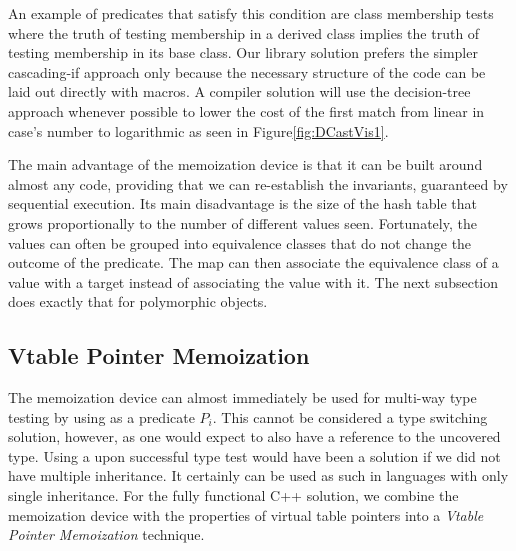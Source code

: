 \noindent
An example of predicates that satisfy this condition are class membership tests
where the truth of testing membership in a derived class implies 
the truth of testing membership in its base class. Our library 
solution prefers the simpler cascading-if approach only because the necessary 
structure of the code can be laid out directly with macros. A compiler solution 
will use the decision-tree approach whenever possible to lower the cost of the 
first match from linear in case's number to logarithmic as seen in Figure\ref{fig:DCastVis1}.


The main advantage of the memoization device is that it can be built around 
almost any code, providing that we can re-establish the invariants, guaranteed 
by sequential execution. Its main disadvantage is the size of the hash table 
that grows proportionally to the number of different values seen. Fortunately, 
the values can often be grouped into equivalence classes that do not change the 
outcome of the predicate. The map can then associate the equivalence class of a 
value with a target instead of associating the value with it. The next 
subsection does exactly that for polymorphic objects.

\subsection{Vtable Pointer Memoization}
\label{sec:vtblmem}

The memoization device can almost immediately be used for multi-way type testing by 
using  as a predicate $P_i$. This cannot be considered a 
type switching solution, however, as one would expect to also have a reference 
to the uncovered type. Using a  upon successful type test 
would have been a solution if we did not have multiple inheritance. It certainly 
can be used as such in languages with only single inheritance. For the fully 
functional C++ solution, we combine the memoization device with the properties 
of virtual table pointers into a \emph{Vtable Pointer Memoization} technique.

